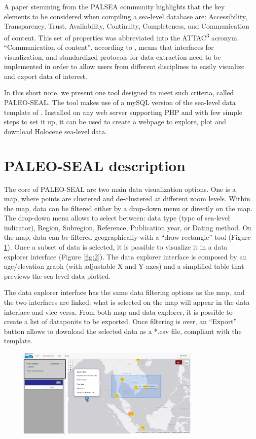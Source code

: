 \documentclass[a4paper,fleqn]{cas-dc}
\begin{document}
A paper stemming from the PALSEA community \citep{dusterhus2016} highlights that the key elements to be considered when compiling a sea-level database are: Accessibility, Transparency, Trust, Availability, Continuity, Completeness, and Communication of
content. This set of properties was abbreviated into the ATTAC\textsuperscript{3} acronym. ``Communication of content'',  according to \citet{dusterhus2016}, means that interfaces for visualization, and standardized protocols for data extraction need to be implemented in order to allow users from different disciplines to easily visualize and export data of interest. 

In this short note, we present one tool designed to meet such criteria, called PALEO-SEAL. The tool makes use of a mySQL version of the sea-level data template of \citet{khan2019}. Installed on any web server supporting PHP and with few simple steps to set it up, it can be used to create a webpage to explore, plot and download Holocene sea-level data. 

\section{PALEO-SEAL description}
The core of PALEO-SEAL are two main data visualization options. One is a map, where points are clustered and de-clustered at different zoom levels. Within the map, data can be filtered either by a drop-down menu or directly on the map. The drop-down menu allows to select between: data type (type of sea-level indicator), Region, Subregion, Reference, Publication year, or Dating method. On the map, data can be filtered geographically with a ``draw rectangle'' tool (Figure \ref{fig:1}). Once a subset of data is selected, it is possible to visualize it in a data explorer interface (Figure \ref{fig:2}). The data explorer interface is composed by an age/elevation graph (with adjustable X and Y axes) and a simplified table that previews the sea-level data plotted. 

The data explorer interface has the same data filtering options as the map, and the two interfaces are linked: what is selected on the map will appear in the data interface and vice-versa. From both map and data explorer, it is possible to create a list of dataponits to be exported. Once filtering is over, an ``Export'' button allows to download the selected data as a *.csv file, compliant with the \citet{khan2019} template.

\begin{figure}
	\centering
	\includegraphics[width=0.8\textwidth]{figs/Figure1.png}
	\caption{}
	\label{fig:1}
\end{figure}
\end{document}
